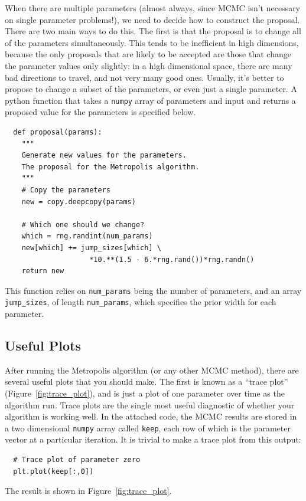 When there are multiple parameters (almost always, since MCMC isn't necessary
on single parameter problems!), we need to decide how to construct the proposal.
There are two main ways to do this. The first is that the proposal is to
change all of the parameters simultaneously. This tends to be inefficient in
high dimensions, because the only proposals that are likely to be accepted
are those that change the parameter values only slightly: in a high dimensional
space, there are many bad directions to travel, and not very many good ones.
Usually, it's better to propose to change a subset of the parameters, or even
just a single parameter. A python function that takes a {\tt numpy} array of
parameters and input and returns a proposed value for the parameters is
specified below.

\begin{verbatim}
  def proposal(params):
    """
    Generate new values for the parameters.
    The proposal for the Metropolis algorithm.
    """
    # Copy the parameters
    new = copy.deepcopy(params)

    # Which one should we change?
    which = rng.randint(num_params)
    new[which] += jump_sizes[which] \
                    *10.**(1.5 - 6.*rng.rand())*rng.randn()
    return new
\end{verbatim}
This function relies on {\tt num\_params} being the number of parameters,
and an array {\tt jump\_sizes}, of length {\tt num\_params}, which specifies
the prior width for each parameter.


\subsection{Useful Plots}
After running the Metropolis algorithm (or any other MCMC method), there are
several useful plots that you should make. The first is known as a
``trace plot'' (Figure~\ref{fig:trace_plot}),
and is just a plot of one parameter over time as the algorithm run. Trace plots
are the single most useful diagnostic of whether your algorithm is working well.
In the attached code, the MCMC results are stored in a two dimensional
{\tt numpy} array called {\tt keep}, each row of which is the parameter vector
at a particular iteration. It is trivial to make a trace plot from this output:

\begin{verbatim}
  # Trace plot of parameter zero
  plt.plot(keep[:,0])
\end{verbatim}
The result is shown in Figure~\ref{fig:trace_plot}.

